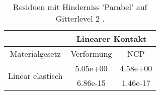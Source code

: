 \begin{table} 
\centering 
\begin{tabular}{c|cc|} 
\cline{2-3} 
 & \multicolumn{2}{|c|}{Linearer Kontakt} \\ 
\hline 
\multicolumn{1}{|c|}{Materialgesetz} & \multicolumn{1}{c|}{Verformung} & \multicolumn{1}{c|}{NCP} \\ 
\hline 
\multicolumn{1}{|c|}{\multirow{2}{*}{Linear elastisch}} &\multicolumn{1}{|c|}{  5.05e+00} & \multicolumn{1}{|c|}{  4.58e+00} \\ 
\multicolumn{1}{|c|}{} & \multicolumn{1}{|c|}{  6.86e-15} & \multicolumn{1}{|c|}{  1.46e-17} \\ 
\hline 
\end{tabular}\caption{Residuen mit Hinderniss 'Parabel' auf Gitterlevel 2 .}\label{tab:Residuum_Parabel_level2}
\end{table} 
